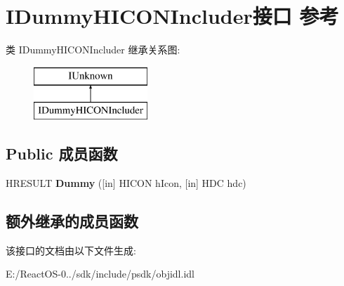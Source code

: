\hypertarget{interface_i_dummy_h_i_c_o_n_includer}{}\section{I\+Dummy\+H\+I\+C\+O\+N\+Includer接口 参考}
\label{interface_i_dummy_h_i_c_o_n_includer}
类 I\+Dummy\+H\+I\+C\+O\+N\+Includer 继承关系图\+:\begin{figure}[H]
\begin{center}
\leavevmode
\includegraphics[height=2.000000cm]{interface_i_dummy_h_i_c_o_n_includer}
\end{center}
\end{figure}
\subsection*{Public 成员函数}
\begin{DoxyCompactItemize}
\item 
\mbox{\label{interface_i_dummy_h_i_c_o_n_includer_afea749a14a2fedac6c0796568c542404}} 
H\+R\+E\+S\+U\+LT {\bfseries Dummy} (\mbox{[}in\mbox{]} H\+I\+C\+ON h\+Icon, \mbox{[}in\mbox{]} H\+DC hdc)
\end{DoxyCompactItemize}
\subsection*{额外继承的成员函数}


该接口的文档由以下文件生成\+:\begin{DoxyCompactItemize}
\item 
E\+:/\+React\+O\+S-\/0../sdk/include/psdk/objidl.\+idl\end{DoxyCompactItemize}
